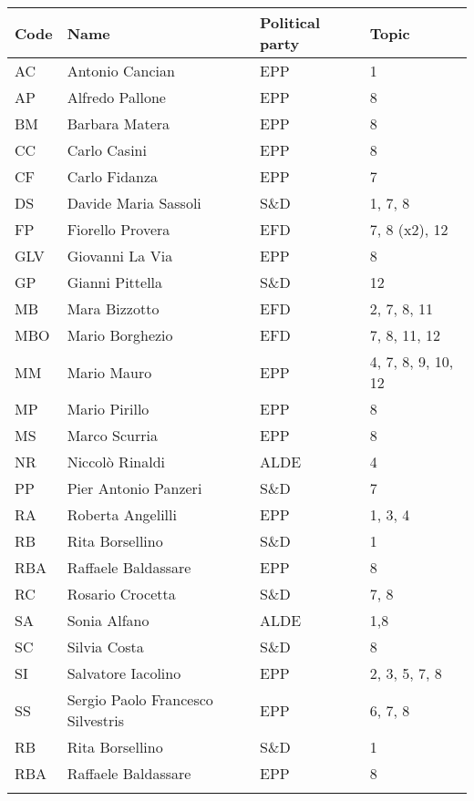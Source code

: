 \documentclass[output=paper]{langscibook}
\begin{document}
\begin{tabularx}{\textwidth}{llll}

\lsptoprule

{\bfseries Code} & {\bfseries Name} & {\bfseries Political party} & {\bfseries Topic}\\
\midrule
AC & Antonio Cancian & EPP & 1\\
AP & Alfredo Pallone & EPP & 8\\
BM & Barbara Matera & EPP & 8\\
CC & Carlo Casini & EPP & 8\\
CF & Carlo Fidanza & EPP & 7\\
DS & Davide Maria Sassoli & S\&D & 1, 7, 8\\
FP & Fiorello Provera & EFD & 7, 8 (x2), 12\\
GLV & Giovanni La Via & EPP & 8\\
GP & Gianni Pittella & S\&D & 12\\
MB & Mara Bizzotto & EFD & 2, 7, 8, 11\\
MBO & Mario Borghezio & EFD & 7, 8, 11, 12\\
MM & Mario Mauro & EPP & 4, 7, 8, 9, 10, 12\\
MP & Mario Pirillo & EPP & 8\\
MS & Marco Scurria & EPP & 8\\
NR & Niccolò Rinaldi & ALDE & 4\\
PP & Pier Antonio Panzeri & S\&D & 7\\
RA & Roberta Angelilli & EPP & 1, 3, 4\\
RB & Rita Borsellino & S\&D & 1\\
RBA & Raffaele Baldassare & EPP & 8\\
RC & Rosario Crocetta & S\&D & 7, 8\\
SA & Sonia Alfano & ALDE & 1,8\\
SC & Silvia Costa & S\&D & 8\\
SI & Salvatore Iacolino & EPP & 2, 3, 5, 7, 8\\
SS & Sergio Paolo Francesco Silvestris & EPP & 6, 7, 8\\
RB & Rita Borsellino & S\&D & 1\\
RBA & Raffaele Baldassare & EPP & 8\\
\lspbottomrule
\end{tabularx}

\sloppy\printbibliography[heading=subbibliography,notkeyword=this]
\end{document}
